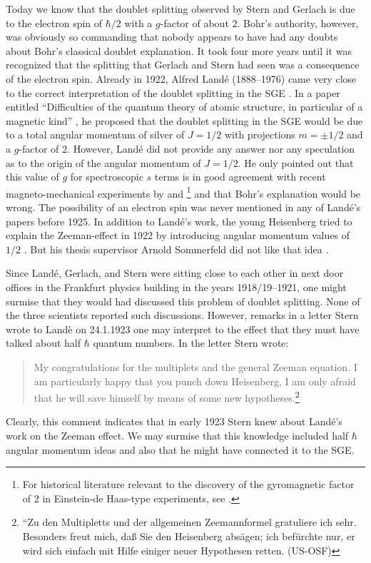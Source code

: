 \documentclass[12pt]{article}
\begin{document}
Today we know that the doublet splitting observed by Stern and Gerlach is due to the electron spin of $\hbar/2$ with a $g$-factor of about $2$. Bohr's authority, however, was obviously so commanding that nobody appears to have had any doubts about Bohr's classical doublet explanation.  It took four more years until it was recognized that the splitting that Gerlach and Stern had seen was a consequence of the electron spin. Already in 1922, Alfred Landé (1888--1976) came very close to the correct interpretation of the doublet splitting in the SGE \citep{LandeA1921Zeemaneffekt2,LandeA1921Zeemaneffekt,LandeA1929Polarisation}. In a paper entitled ``Difficulties of the quantum theory of atomic structure, in particular of a magnetic kind” 
\citep{LandeA1924Schwierigkeiten}, he proposed that the doublet splitting in the SGE would be due to a total angular momentum of silver of $J=1/2$ with projections $m=\pm 1/2$ and a $g$-factor of $2$. However, Landé did not provide any answer nor any speculation as to the origin of the angular momentum of $J=1/2$. He only pointed out that this value of $g$ for spectroscopic $s$ terms is in good agreement with recent magneto-mechanical experiments by \cite{BarnettS1915Magnetization} and \cite{EinsteinAEtAl1915Nachweis}\footnote{For historical literature relevant to the discovery of the gyromagnetic factor of 2 in Einstein-de Haas-type experiments, see \cite[Doc.~215]{CPAE10}.}
 and that Bohr's explanation would be wrong. The possibility of an electron spin was never mentioned in any of Landé's papers before 1925. In addition to Landé's work, the young Heisenberg tried to explain the Zeeman-effect in 1922 by introducing angular momentum values of $1/2$ \citep{HeisenbergW1922Quantentheorie}. But his thesis supervisor Arnold Sommerfeld did not like that idea \cite[secs.~8.4--8.5]{EckertM2013Sommerfled}.
 
Since Landé, Gerlach, and Stern were sitting close to each other in next door offices in the Frankfurt physics building in the years 1918/19--1921, one might surmise that they would had discussed this problem of doublet splitting. None of the three scientists reported such discussions. However, remarks in a letter Stern wrote to Landè on 24.1.1923 one may interpret to the effect that they must have talked about half $\hbar$ quantum numbers. In the letter Stern wrote: 
\begin{quote}
My congratulations for the multiplets and the general Zeeman equation. I am particularly happy that you punch down Heisenberg, I am only afraid that he will save himself by means of some new hypotheses.\footnote{%
``Zu den Multipletts und der allgemeinen Zeemannformel gratuliere ich sehr. Besonders freut mich, daß Sie den Heisenberg absägen; ich befürchte nur, er wird sich einfach mit Hilfe einiger neuer Hypothesen retten. (US-OSF)}
\end{quote}
Clearly, this comment indicates that in early 1923 Stern knew about Landé's work on the Zeeman effect. We may surmise that this knowledge included half $\hbar$ angular momentum ideas and also that he might have connected it to the SGE.
\end{document}
